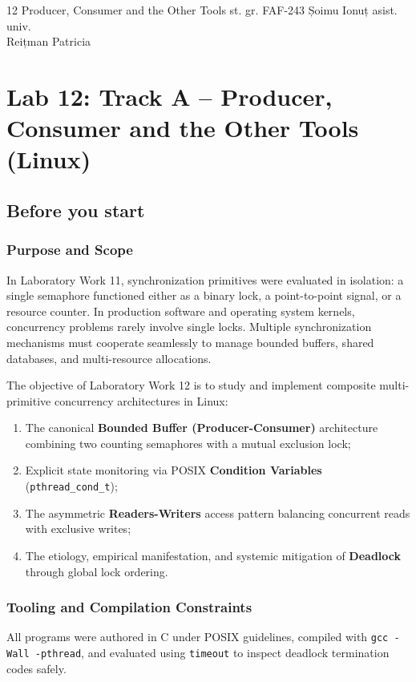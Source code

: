 \documentclass{labreport}
\begin{document}
\labtitle
    {12}
    {Producer, Consumer and the Other Tools}
    {st. gr. FAF-243}
    {Șoimu Ionuț}
    {asist. univ.\\[0.15cm] Reițman Patricia}

\tableofcontents
\newpage

\section{Lab 12: Track A -- Producer, Consumer and the Other Tools (Linux)}

\subsection{Before you start}

\subsubsection*{Purpose and Scope}
In Laboratory Work 11, synchronization primitives were evaluated in isolation: a single semaphore functioned either as a binary lock, a point-to-point signal, or a resource counter. In production software and operating system kernels, concurrency problems rarely involve single locks. Multiple synchronization mechanisms must cooperate seamlessly to manage bounded buffers, shared databases, and multi-resource allocations.

The objective of Laboratory Work 12 is to study and implement composite multi-primitive concurrency architectures in Linux:
\begin{enumerate}[label=(\alph*), noitemsep]
    \item The canonical \textbf{Bounded Buffer (Producer-Consumer)} architecture combining two counting semaphores with a mutual exclusion lock;
    \item Explicit state monitoring via POSIX \textbf{Condition Variables} (\texttt{pthread\_cond\_t});
    \item The asymmetric \textbf{Readers-Writers} access pattern balancing concurrent reads with exclusive writes;
    \item The etiology, empirical manifestation, and systemic mitigation of \textbf{Deadlock} through global lock ordering.
\end{enumerate}

\subsubsection*{Tooling and Compilation Constraints}
All programs were authored in C under POSIX guidelines, compiled with \texttt{gcc -Wall -pthread}, and evaluated using \texttt{timeout} to inspect deadlock termination codes safely.
\end{document}
